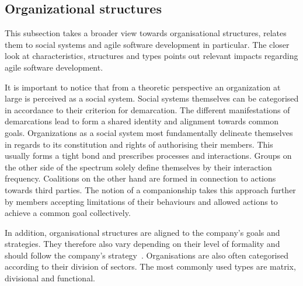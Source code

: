 \subsection{Organizational structures}

This subsection takes a broader view towards organisational structures, relates them to social systems and agile software development in particular. The closer look at characteristics, structures and types points out relevant impacts regarding agile software development. 

It is important to notice that from a theoretic perspective an organization at large is perceived as a social system. Social systems themselves can be categorised in accordance to their criterion for demarcation. The different manifestations of demarcations lead to form a shared identity and alignment towards common goals. Organizations as a social system most fundamentally delineate themselves in regards to its constitution and rights of authorising their members. This usually forms a tight bond and prescribes processes and interactions. Groups on the other side of the spectrum solely define themselves by their interaction frequency. Coalitions on the other hand are formed in connection to actions towards third parties. The notion of a companionship takes this approach further by members accepting limitations of their behaviours and allowed actions to achieve a common goal collectively.

In addition, organisational structures are aligned to the company's goals and strategies. They therefore also vary depending on their level of formality and should follow the company's strategy~\citep{chandler1962strategystructure}. Organisations are also often categorised according to their division of sectors. The most commonly used types are matrix, divisional and functional. 

